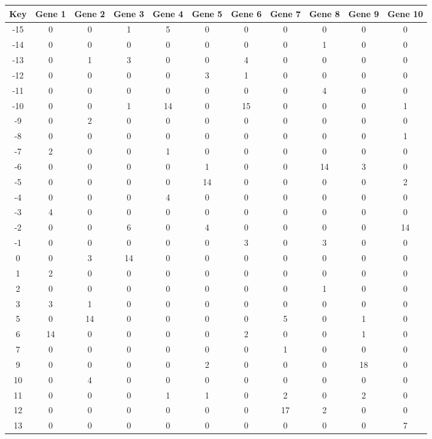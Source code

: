 \begin{tabular}{|c|c|c|c|c|c|c|c|c|c|c|}
\hline
Key & Gene 1 & Gene 2 & Gene 3 & Gene 4 & Gene 5 & Gene 6 & Gene 7 & Gene 8 & Gene 9 & Gene 10 \\
\hline
-15 & 0 & 0 & 1 & 5 & 0 & 0 & 0 & 0 & 0 & 0 \\
-14 & 0 & 0 & 0 & 0 & 0 & 0 & 0 & 1 & 0 & 0 \\
-13 & 0 & 1 & 3 & 0 & 0 & 4 & 0 & 0 & 0 & 0 \\
-12 & 0 & 0 & 0 & 0 & 3 & 1 & 0 & 0 & 0 & 0 \\
-11 & 0 & 0 & 0 & 0 & 0 & 0 & 0 & 4 & 0 & 0 \\
-10 & 0 & 0 & 1 & 14 & 0 & 15 & 0 & 0 & 0 & 1 \\
-9 & 0 & 2 & 0 & 0 & 0 & 0 & 0 & 0 & 0 & 0 \\
-8 & 0 & 0 & 0 & 0 & 0 & 0 & 0 & 0 & 0 & 1 \\
-7 & 2 & 0 & 0 & 1 & 0 & 0 & 0 & 0 & 0 & 0 \\
-6 & 0 & 0 & 0 & 0 & 1 & 0 & 0 & 14 & 3 & 0 \\
-5 & 0 & 0 & 0 & 0 & 14 & 0 & 0 & 0 & 0 & 2 \\
-4 & 0 & 0 & 0 & 4 & 0 & 0 & 0 & 0 & 0 & 0 \\
-3 & 4 & 0 & 0 & 0 & 0 & 0 & 0 & 0 & 0 & 0 \\
-2 & 0 & 0 & 6 & 0 & 4 & 0 & 0 & 0 & 0 & 14 \\
-1 & 0 & 0 & 0 & 0 & 0 & 3 & 0 & 3 & 0 & 0 \\
0 & 0 & 3 & 14 & 0 & 0 & 0 & 0 & 0 & 0 & 0 \\
1 & 2 & 0 & 0 & 0 & 0 & 0 & 0 & 0 & 0 & 0 \\
2 & 0 & 0 & 0 & 0 & 0 & 0 & 0 & 1 & 0 & 0 \\
3 & 3 & 1 & 0 & 0 & 0 & 0 & 0 & 0 & 0 & 0 \\
5 & 0 & 14 & 0 & 0 & 0 & 0 & 5 & 0 & 1 & 0 \\
6 & 14 & 0 & 0 & 0 & 0 & 2 & 0 & 0 & 1 & 0 \\
7 & 0 & 0 & 0 & 0 & 0 & 0 & 1 & 0 & 0 & 0 \\
9 & 0 & 0 & 0 & 0 & 2 & 0 & 0 & 0 & 18 & 0 \\
10 & 0 & 4 & 0 & 0 & 0 & 0 & 0 & 0 & 0 & 0 \\
11 & 0 & 0 & 0 & 1 & 1 & 0 & 2 & 0 & 2 & 0 \\
12 & 0 & 0 & 0 & 0 & 0 & 0 & 17 & 2 & 0 & 0 \\
13 & 0 & 0 & 0 & 0 & 0 & 0 & 0 & 0 & 0 & 7 \\
\hline
\end{tabular}